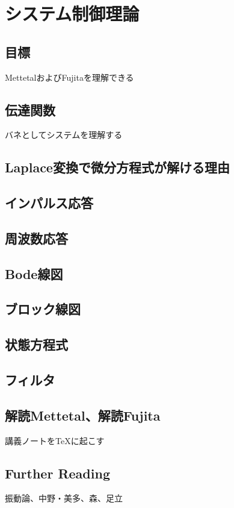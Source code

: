 \chapter{システム制御理論}
\section{目標}
MettetalおよびFujitaを理解できる
\section{伝達関数}
バネとしてシステムを理解する
\section{Laplace変換で微分方程式が解ける理由}
\section{インパルス応答}
\section{周波数応答}
\section{Bode線図}
\section{ブロック線図}
\section{状態方程式}
\section{フィルタ}
\section{解読Mettetal、解読Fujita}

講義ノートをTeXに起こす

\section{Further Reading}
振動論、中野・美多、森、足立
